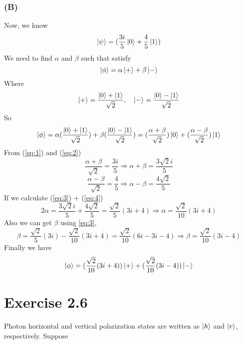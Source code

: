 \documentclass[12pt]{article}
\begin{document}
\subsubsection*{(B)}
Now, we know
\begin{equation}
\label{eq:1}
\ket{\psi} = (\frac{3i}{5}\ket{0} + \frac{4}{5}\ket{1})
\end{equation}
We need to find $\alpha$ and $\beta$ such that satisfy
\[
\ket{\phi} = \alpha \ket{+} + \beta \ket{-}
\]
Where
\[
\ket{+} = \frac{\ket{0} + \ket{1}}{\sqrt{2}}, \quad \ket{-} = \frac{\ket{0} - \ket{1}}{\sqrt{2}}
\]
So
\begin{equation}
\label{eq:2}
\ket{\phi} = \alpha (\frac{\ket{0} + \ket{1}}{\sqrt{2}}) + \beta (\frac{\ket{0} - \ket{1}}{\sqrt{2}})
= (\frac{\alpha + \beta}{\sqrt{2}})\ket{0} + (\frac{\alpha - \beta}{\sqrt{2}})\ket{1} 
\end{equation}
From (\ref{eq:1}) and (\ref{eq:2})
\begin{equation}
\label{eq:3}
\frac{\alpha + \beta}{\sqrt{2}} = \frac{3i}{5} \Longrightarrow \alpha + \beta = \frac{3\sqrt{2}i}{5}
\end{equation}
\begin{equation}
\label{eq:4}
\frac{\alpha - \beta}{\sqrt{2}} = \frac{4}{5} \Longrightarrow \alpha - \beta = \frac{4\sqrt{2}}{5} 
\end{equation}
If we calculate (\ref{eq:3}) + (\ref{eq:4})
\begin{equation*}
2\alpha = \frac{3\sqrt{2}i}{5} + \frac{4\sqrt{2}}{5} = \frac{\sqrt{2}}{5}(3i + 4) \Longrightarrow \alpha = \frac{\sqrt{2}}{10}(3i + 4)
\end{equation*}
Also we can get $\beta$ using \ref{eq:3},
\begin{equation*}
\beta = \frac{\sqrt{2}}{5}(3i) - \frac{\sqrt{2}}{10}(3i + 4) = \frac{\sqrt{2}}{10}(6i - 3i - 4) \Longrightarrow \beta = \frac{\sqrt{2}}{10}(3i - 4)
\end{equation*}
Finally we have 
\begin{equation*}
\ket{\phi} = (\frac{\sqrt{2}}{10}(3i + 4)) \ket{+} + (\frac{\sqrt{2}}{10}(3i - 4)) \ket{-}
\end{equation*}

\section*{Exercise 2.6}
Photon horizontal and vertical polarization states are written as $\ket{h}$ and $\ket{v}$,
respectively. Suppose
\end{document}
